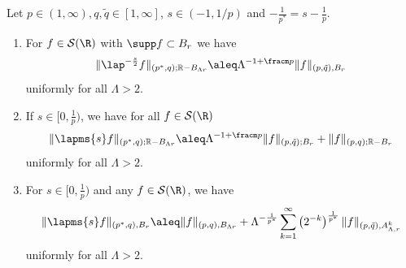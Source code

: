 \begin{lemma}\label{lem:QuasiLocalityOfNorms}
Let $p \in (1,\infty), q,\tilde q \in [1,\infty]$, $s \in (-1,1/p)$ and $- \frac 1 {p^\ast} = s - \frac 1 p$.
\begin{enumerate}
  \item For $f \in\mathcal S(\R)$ with $\supp f \subset B_r$ we have
    \begin{equation*}
  \|\lap^{-\frac{s}{2}}f\|_{(p^\ast,q);\mathbb R - B_{\Lambda r}} 
  \aleq \Lambda^{-1+\fracm p} \|f\|_{(p, \tilde q),B_{r}}
 \end{equation*}
 uniformly for all $\Lambda >2$.
 
 \item If $s \in[0,\frac1p)$, we have for all $f \in\mathcal S(\R)$
 \begin{equation*}
  \|\lapms{s}f\|_{(p^\ast,q);\mathbb R - B_{\Lambda r}} 
  \aleq \Lambda^{-1+\fracm p} \|f\|_{(p, \tilde q);B_r} + \|f\|_{(p, q);\mathbb R - B_{r}}
 \end{equation*} 
 uniformly for all $\Lambda >2$.

 \item For $s\in[0,\frac1p)$ and any $f\in\mathcal S(\R)$, we have
 \begin{equation*}
    \|\lapms{s}f\|_{(p^\ast,q),B_r} 
    \aleq \|f\|_{(p,q),B_{\Lambda r}} + \Lambda^{-\frac 1{p^\ast}}
	\sum_{k=1}^\infty \left(2^{-k}\right)^{\frac 1 {p^\ast}}
	\|f\|_{(p,\tilde q),A^k_{\Lambda, r}}
 \end{equation*}
 uniformly for all $\Lambda >2$.
\end{enumerate}

\end{lemma}


